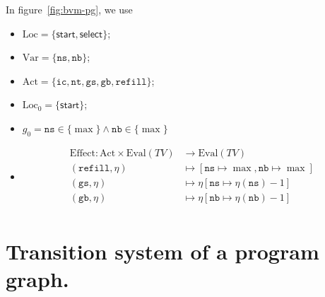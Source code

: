 \documentclass[./main]{subfiles}
\begin{document}
  \begin{exm}
    In figure~\ref{fig:bvm-pg}, we use 
    \begin{itemize}
      \item $\mathrm{Loc} = \{\mathsf{start},\mathsf{select}\}$;
      \item $\mathrm{Var} = \{\mathtt{ns}, \mathtt{nb}\}$;
      \item $\mathrm{Act} = \{\mathtt{ic}, \mathtt{nt}, \mathtt{gs}, \mathtt{gb}, \mathtt{refill}\}$;
      \item $\mathrm{Loc}_0 = \{\mathsf{start}\}$;
      \item $g_0 = \mathtt{ns} \in  \{\max\} \land \mathtt{nb} \in \{\max\}$ 
      \item 
        \begin{align*}
          \mathrm{Effect}: \mathrm{Act} \times \mathrm{Eval}(TV) &\longrightarrow \mathrm{Eval}(TV) \\
          (\mathtt{refill}, \eta) &\longmapsto[\mathtt{ns} \mapsto {\max}, \mathtt{nb} \mapsto {\max}]\\
          (\mathtt{gs}, \eta) &\longmapsto \eta[\mathtt{ns} \mapsto \eta(\mathtt{ns}) - 1]\\
          (\mathtt{gb}, \eta) &\longmapsto \eta[\mathtt{nb} \mapsto \eta(\mathtt{nb}) - 1]\\
        \end{align*}
    \end{itemize}
  \end{exm}

  \section{Transition system of a program graph.}
\end{document}

